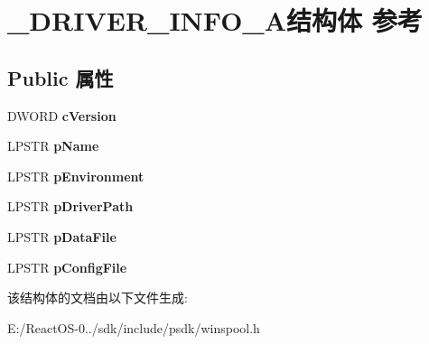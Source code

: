 \hypertarget{struct___d_r_i_v_e_r___i_n_f_o__2_a}{}\section{\+\_\+\+D\+R\+I\+V\+E\+R\+\_\+\+I\+N\+F\+O\+\_\+A结构体 参考}
\label{struct___d_r_i_v_e_r___i_n_f_o__2_a}
\subsection*{Public 属性}
\begin{DoxyCompactItemize}
\item 
\mbox{\label{struct___d_r_i_v_e_r___i_n_f_o__2_a_a332bd2d9d82f46cd8369aa813a472960}} 
D\+W\+O\+RD {\bfseries c\+Version}
\item 
\mbox{\label{struct___d_r_i_v_e_r___i_n_f_o__2_a_a1872ee6870404f2412aa099d234b12d1}} 
L\+P\+S\+TR {\bfseries p\+Name}
\item 
\mbox{\label{struct___d_r_i_v_e_r___i_n_f_o__2_a_ab6c859d147ce45df66cd87d1fb6c5bb6}} 
L\+P\+S\+TR {\bfseries p\+Environment}
\item 
\mbox{\label{struct___d_r_i_v_e_r___i_n_f_o__2_a_a1acfe9dca4d317c4e135087d8caf4963}} 
L\+P\+S\+TR {\bfseries p\+Driver\+Path}
\item 
\mbox{\label{struct___d_r_i_v_e_r___i_n_f_o__2_a_a6783738ff9c6b2df6b36c8d7584180d3}} 
L\+P\+S\+TR {\bfseries p\+Data\+File}
\item 
\mbox{\label{struct___d_r_i_v_e_r___i_n_f_o__2_a_a176266f5076b72589e0d9d02d2728cb0}} 
L\+P\+S\+TR {\bfseries p\+Config\+File}
\end{DoxyCompactItemize}


该结构体的文档由以下文件生成\+:\begin{DoxyCompactItemize}
\item 
E\+:/\+React\+O\+S-\/0../sdk/include/psdk/winspool.\+h\end{DoxyCompactItemize}
